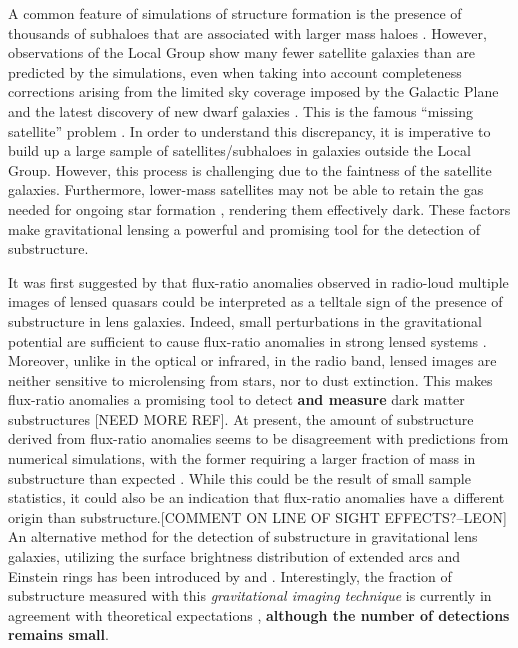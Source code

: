 \documentclass[useAMS,usenatbib]{mn2e}
\begin{document}
A common feature of simulations of structure formation is the presence
of thousands of subhaloes that are associated with larger mass haloes \citep[e.g.][]{Springel08}.
However, observations of the Local Group show many fewer satellite
galaxies than are predicted by the simulations, even when taking into
account completeness corrections arising from the limited sky coverage
imposed by the Galactic Plane and the latest discovery of new dwarf galaxies \citep{DES15,Kop15}.  
This is the famous ``missing satellite'' problem \citep{Klypin1999, Moore1999, S07}. In order to
understand this discrepancy, it is imperative to build up a large
sample of satellites/subhaloes in galaxies outside the Local Group.
 However, this process is challenging due to the faintness of the satellite
galaxies.  Furthermore, lower-mass satellites may not be able to
retain the gas needed for ongoing star formation \citep[e.g.,][]{P11},
rendering them effectively dark.  These factors make gravitational
lensing a powerful and promising tool for the detection of
substructure.

It was first suggested by \citet{Mao1998} that flux-ratio anomalies
observed in radio-loud multiple images of lensed quasars could be
interpreted as a telltale sign of the presence of substructure in lens
galaxies.  Indeed, small perturbations in the gravitational potential
are sufficient to cause flux-ratio anomalies in strong lensed systems
\citep{Bradac02}.  Moreover, unlike in the optical or infrared, in the
radio band, lensed images are neither sensitive to microlensing from
stars, nor to dust extinction. This makes flux-ratio anomalies a promising
tool to detect \textbf{and measure} dark matter substructures \citep{Dalal2002,N13} [NEED MORE REF].  
At present, the amount of substructure derived from flux-ratio anomalies
seems to be disagreement with predictions from numerical simulations, with
the former requiring a larger fraction of mass in substructure than
expected \citep{Xu14}. While this could be the result of small sample
statistics, it could also be an indication that flux-ratio anomalies
have a different origin than substructure.[COMMENT ON LINE OF SIGHT EFFECTS?--LEON]
%
An alternative method for
the detection of substructure in gravitational lens galaxies, utilizing
the surface brightness distribution of extended arcs and Einstein rings
has been introduced by \citet{K05} and \citet{V09}. Interestingly, the fraction of
substructure measured with this \emph{gravitational imaging technique}
is currently in agreement with theoretical expectations \citep{V14a,V12}, \textbf{although the number of detections remains small}.
\end{document}

